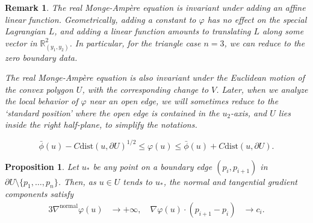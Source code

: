 \documentclass[10pt,a4paper]{amsart}
\newtheorem{remark}{Remark}
\newtheorem{proposition}{Proposition}
\begin{document}
\begin{remark}\label{standardposition}
The real Monge-Amp\`ere equation is invariant under adding an affine linear function. Geometrically, adding a constant to $\varphi$ has no effect on the special Lagrangian $L$, and adding a linear function amounts to translating $L$ along some vector in $\mathbb{R}_{(y_1,y_2)}^2$. In particular, for the triangle case $n=3$, we can reduce to the zero boundary data.  

The real Monge-Amp\`ere equation is also invariant under the Euclidean motion of the convex polygon $U$, with the corresponding change to $V$. Later, when we analyze the local behavior of $\varphi$ near an open edge, we will sometimes reduce to the `standard position' where the open edge is contained in the $u_2$-axis, and $U$ lies inside the right half-plane, to simplify the notations.
\end{remark}

\begin{equation}\label{boundarycontinuity}
\bar{\phi}(u)- C\text{dist}(u, \partial U)^{1/2} \leq \varphi(u)\leq \bar{\phi}(u)+ C\text{dist}(u, \partial U). 
\end{equation}

\begin{proposition}\label{prop:gradientdivergence}
\label{blowup}
Let $u_*$ be any point on a boundary edge $(p_i, p_{i+1})$ in $\partial U\setminus \{ p_1,\ldots, p_n\}$. Then, as $u\in U$ tends to $u_*$, the normal and tangential gradient components satisfy
\begin{alignat*}{3}
        \nabla^{\text{normal}} \varphi (u) &\to +\infty, 
        \quad
         \nabla \varphi (u)\cdot (p_{i+1}-p_i) &\to c_i.
\end{alignat*}
\end{proposition}
\end{document}
